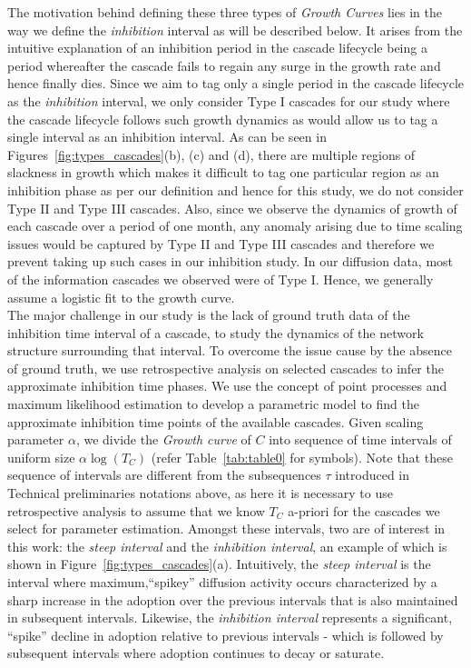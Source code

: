 \documentclass[smallextended]{svjour3}       %
\theoremstyle{definition}
\begin{document}
The motivation behind defining these three types of \textit{Growth Curves} lies in the way we define the \textit{inhibition} interval as will be described below. It arises from the intuitive explanation of an inhibition period in the cascade lifecycle being a period whereafter the cascade fails to regain any surge in the growth rate and hence finally dies. Since we aim to tag only a single period in the cascade lifecycle as the \textit{inhibition} interval, we only consider Type I cascades for our study where the cascade lifecycle follows such growth dynamics as would allow us to tag a single interval as an inhibition interval. As can be seen in Figures~\ref{fig:types_cascades}(b), (c) and (d), there are multiple regions of slackness in growth which makes it difficult to tag one particular region as an inhibition phase as per our definition and hence for this study, we do not consider Type II and Type III cascades. Also, since we observe the dynamics of growth of each cascade over a period of one month, any anomaly arising due to time scaling issues would be captured by Type II and Type III cascades and therefore we prevent taking up such cases in our inhibition study. In our diffusion data, most of the information cascades we observed were of Type I.  Hence, we generally assume a logistic fit to the growth curve.  \\

The major challenge in our study is the lack of ground truth data of the inhibition time interval of a cascade, to study the dynamics of the network structure surrounding that interval. To overcome the issue cause by the absence of ground truth, we use retrospective analysis on selected cascades to infer the approximate inhibition time phases. We use the concept of point processes and maximum likelihood estimation to develop a parametric model to find the approximate inhibition time points of the available cascades. Given scaling parameter $\alpha$, we divide the \textit{Growth curve} of $C$ into sequence of time intervals of uniform size $\alpha \log(T_C)$ (refer Table~\ref{tab:table0} for symbols). Note that these sequence of intervals are different from the subsequences $\tau$ introduced in Technical preliminaries notations above, as here it is necessary to use retrospective analysis to assume that we know $T_C$ a-priori for the cascades we select for parameter estimation.  Amongst these intervals, two are of interest in this work: the \textit{steep interval} and the \textit{inhibition interval}, an example of which is shown in Figure~\ref{fig:types_cascades}(a). Intuitively, the \textit{steep interval} is the interval where maximum,``spikey'' diffusion activity occurs characterized by a sharp increase in the adoption over the previous intervals that is also maintained in subsequent intervals.  Likewise, the \textit{inhibition interval} represents a significant, ``spike'' decline in adoption relative to previous intervals - which is followed by subsequent intervals where adoption continues to decay or saturate.
\end{document}
